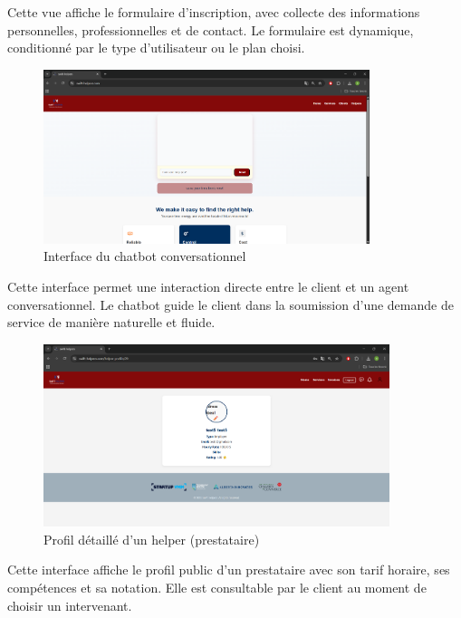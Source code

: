 \noindent
Cette vue affiche le formulaire d’inscription, avec collecte des informations personnelles, professionnelles et de contact. Le formulaire est dynamique, conditionné par le type d’utilisateur ou le plan choisi.


\vspace{0.5cm}

\begin{figure}[H]
    \centering
    \includegraphics[width=0.85\textwidth]{figures/interface principale.png}
    \caption{Interface du chatbot conversationnel}
\end{figure}

\noindent
Cette interface permet une interaction directe entre le client et un agent conversationnel. Le chatbot guide le client dans la soumission d’une demande de service de manière naturelle et fluide.

\vspace{0.5cm}

\begin{figure}[H]
    \centering
    \includegraphics[width=0.9\textwidth]{figures/profil helper.png}
    \caption{Profil détaillé d’un helper (prestataire)}
\end{figure}

\noindent
Cette interface affiche le profil public d’un prestataire avec son tarif horaire, ses compétences et sa notation. Elle est consultable par le client au moment de choisir un intervenant.

